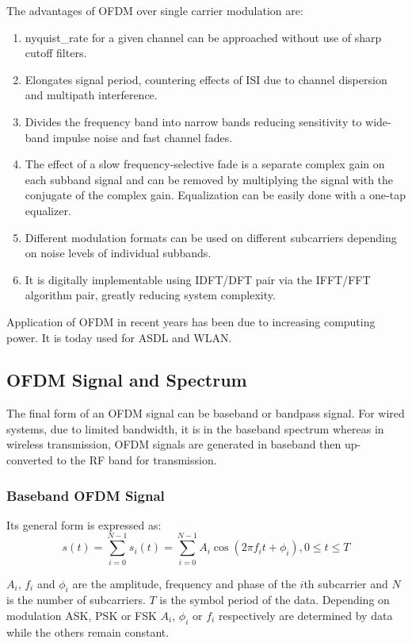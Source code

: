 \noindent The advantages of \gls{OFDM} over single carrier modulation are:
\begin{enumerate}
	\item \gls{nyquist_rate} for a given channel can be approached without use of sharp cutoff filters.
	\item Elongates signal period, countering effects of \gls{ISI} due to channel dispersion and multipath interference.
	\item Divides the frequency band into narrow bands reducing sensitivity to wide-band impulse noise and fast channel fades.
	\item The effect of a slow frequency-selective fade is a separate complex gain on each \gls{subband} signal and can be removed by multiplying the signal with the conjugate of the complex gain. Equalization can be easily done with a one-tap equalizer.
	\item Different modulation formats can be used on different \gls{subcarrier}s depending on noise levels of individual \gls{subband}s.
	\item It is digitally implementable using \gls{IDFT}/\gls{DFT} pair via the \gls{IFFT}/\gls{FFT} algorithm pair, greatly reducing system complexity.
\end{enumerate}
Application of \gls{OFDM} in recent years has been due to increasing computing power. It is today used for \gls{ASDL} and \gls{WLAN}.

\subsection{OFDM Signal and Spectrum}
The final form of an OFDM signal can be baseband or bandpass signal. For wired systems, due to limited bandwidth, it is in the baseband spectrum whereas in wireless transmission, \gls{OFDM} signals are generated in baseband then up-converted to the \gls{RF} band for transmission.

\subsubsection{Baseband OFDM Signal}
Its general form is expressed as:
$$s(t) = \sum_{i=0}^{N-1}s_i(t) = \sum_{i=0}^{N-1}A_i\cos\left( 2\pi f_it + \phi_i\right), 0\leq t\leq T$$

$A_i$, $f_i$ and $\phi_i$ are the amplitude, frequency and phase of the $i$th \gls{subcarrier} and $N$ is the number of \gls{subcarrier}s. $T$ is the symbol period of the data. Depending on modulation \gls{ASK}, \gls{PSK} or \gls{FSK} $A_i$, $\phi_i$ or $f_i$ respectively are determined by data while the others remain constant.

